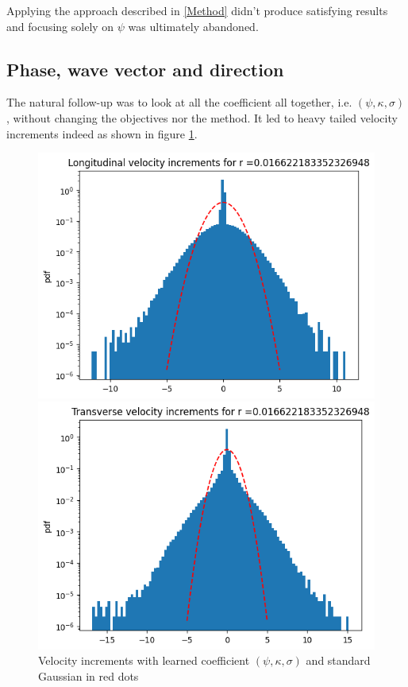 \documentclass[a4paper,12pt]{article}
\theoremstyle{definition}
\begin{document}
\bigskip
Applying the approach described in  \ref{Method} didn't produce satisfying results and focusing solely on $\psi$ was ultimately abandoned.



\subsection{Phase, wave vector and direction}
The natural follow-up was to look at all the coefficient all together, i.e. $(\psi,\kappa,\sigma)$, without changing the objectives nor the method. It led to heavy tailed velocity increments indeed as shown in figure \ref{fig:VelIncrPSIKAPPASIGMA}.

\begin{figure}[H]
    \centering
    \begin{minipage}{0.48\textwidth}
        \centering
        \includegraphics[width=\linewidth]{VelIncrPSIKAPPASIGMA/VelIncrLong.png}
    \end{minipage}\hfill
    \begin{minipage}{0.48\textwidth}
        \centering
        \includegraphics[width=\linewidth]{VelIncrPSIKAPPASIGMA/VelIncrTrans.png}
    \end{minipage}
    \caption{Velocity increments with learned coefficient \((\psi,\kappa,\sigma)\) and standard Gaussian in red dots}
    \label{fig:VelIncrPSIKAPPASIGMA}
\end{figure}
\end{document}
